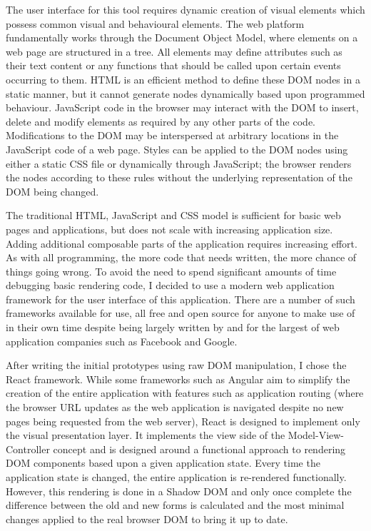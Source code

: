 The user interface for this tool requires dynamic creation of visual elements which possess common visual and behavioural elements. The web platform fundamentally works through the Document Object Model, where elements on a web page are structured in a tree. All elements may define attributes such as their text content or any functions that should be called upon certain events occurring to them. HTML is an efficient method to define these DOM nodes in a static manner, but it cannot generate nodes dynamically based upon programmed behaviour. JavaScript code in the browser may interact with the DOM to insert, delete and modify elements as required by any other parts of the code. Modifications to the DOM may be interspersed at arbitrary locations in the JavaScript code of a web page. Styles can be applied to the DOM nodes using either a static CSS file or dynamically through JavaScript; the browser renders the nodes according to these rules without the underlying representation of the DOM being changed.

The traditional HTML, JavaScript and CSS model is sufficient for basic web pages and applications, but does not scale with increasing application size. Adding additional composable parts of the application requires increasing effort. As with all programming, the more code that needs written, the more chance of things going wrong. To avoid the need to spend significant amounts of time debugging basic rendering code, I decided to use a modern web application framework for the user interface of this application. There are a number of such frameworks available for use, all free and open source for anyone to make use of in their own time despite being largely written by and for the largest of web application companies such as Facebook and Google.

After writing the initial prototypes using raw DOM manipulation, I chose the React framework. While some frameworks such as Angular aim to simplify the creation of the entire application with features such as application routing (where the browser URL updates as the web application is navigated despite no new pages being requested from the web server), React is designed to implement only the visual presentation layer. It implements the view side of the Model-View-Controller concept and is designed around a functional approach to rendering DOM components based upon a given application state\cite{Gackenheimer2015}. Every time the application state is changed, the entire application is re-rendered functionally. However, this rendering is done in a Shadow DOM and only once complete the difference between the old and new forms is calculated and the most minimal changes applied to the real browser DOM to bring it up to date.

